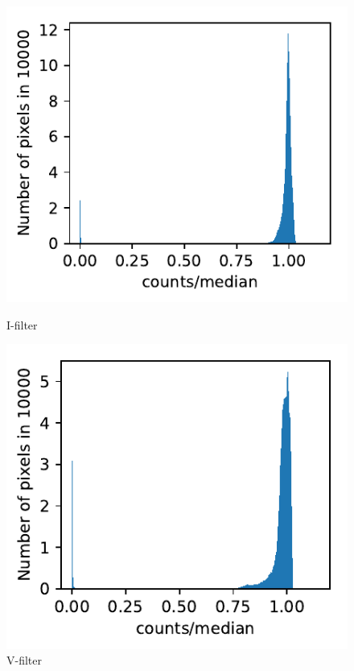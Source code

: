\documentclass[12pt]{article}
\begin{document}
\begin{figure}[H]
\begin{minipage}[t]{0.32\textwidth}
	\centering
	\includegraphics[width=\textwidth]{figures/Hist_I.pdf}
	\caption{I-filter}
	\label{Hist_I}
\end{minipage}
\begin{minipage}[t]{0.32\textwidth}
	\centering
	\includegraphics[width=\textwidth]{figures/Hist_V.pdf}
	\caption{V-filter}

\end{minipage}
\end{figure}
\end{document}
